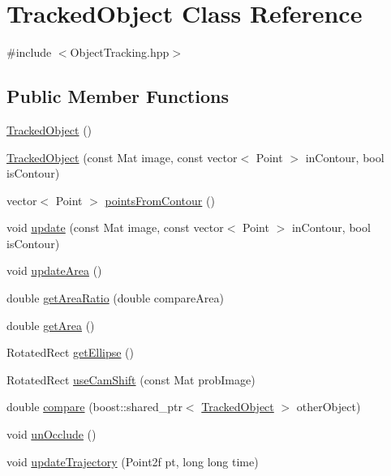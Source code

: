 \hypertarget{classTrackedObject}{\section{\-Tracked\-Object \-Class \-Reference}
\label{classTrackedObject}
}


{\ttfamily \#include $<$\-Object\-Tracking.\-hpp$>$}

\subsection*{\-Public \-Member \-Functions}
\begin{DoxyCompactItemize}
\item 
\hyperlink{classTrackedObject_ae5a9674bcce5464701811b6cd139dfaf}{\-Tracked\-Object} ()
\item 
\hyperlink{classTrackedObject_ab8e14a0aab26a0bdc0099040ca9b1975}{\-Tracked\-Object} (const \-Mat image, const vector$<$ \-Point $>$ in\-Contour, bool is\-Contour)
\item 
vector$<$ \-Point $>$ \hyperlink{classTrackedObject_a27cd23236a761c4b79b2cc21ac2dad1c}{points\-From\-Contour} ()
\item 
void \hyperlink{classTrackedObject_a1e64a7bdfbb5f13bf581929b96a49e42}{update} (const \-Mat image, const vector$<$ \-Point $>$ in\-Contour, bool is\-Contour)
\item 
void \hyperlink{classTrackedObject_aaa266cb2811258be033d3c7670324ddc}{update\-Area} ()
\item 
double \hyperlink{classTrackedObject_ac5ef3f8468385c888b790d05f071c8bd}{get\-Area\-Ratio} (double compare\-Area)
\item 
double \hyperlink{classTrackedObject_a183c7789fb8df620622783ab97c66a88}{get\-Area} ()
\item 
\-Rotated\-Rect \hyperlink{classTrackedObject_aa4ad07e10c8d47b3689f99de663e6ab7}{get\-Ellipse} ()
\item 
\-Rotated\-Rect \hyperlink{classTrackedObject_a69520a9761349dcb5ae44d46076613ea}{use\-Cam\-Shift} (const \-Mat prob\-Image)
\item 
double \hyperlink{classTrackedObject_a6b77fdd69359c35be5125a4fe5117673}{compare} (boost\-::shared\-\_\-ptr$<$ \hyperlink{classTrackedObject}{\-Tracked\-Object} $>$ other\-Object)
\item 
void \hyperlink{classTrackedObject_ac712fbe26e7f573414240f52daa2f770}{un\-Occlude} ()
\item 
void \hyperlink{classTrackedObject_a81cc3d71ac4fc01add8749b65b0a7a10}{update\-Trajectory} (\-Point2f pt, long long time)
\end{DoxyCompactItemize}
